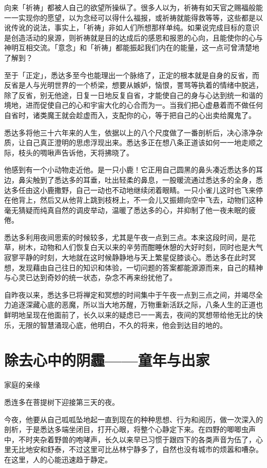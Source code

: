 \documentclass[12pt,twoside,openany]{book}
\begin{document}
向来「祈祷」都被人自己的欲望所操纵了。很多人以为，祈祷有如天官之赐福般能一一实现你的愿望，以为念经可以得什么福报，或祈祷就能得救等等，这些都是以讹传讹的说法，事实上，「祈祷」非如人们所想那样单纯。如果说完成目标的意识是创造活动的泉源，则祈祷就是目的达成后的感恩和报恩的心向，且能使你的心与神明互相交流。「意念」和「祈祷」都能振起我们内在的能量，这一点可曾清楚地了解到？

至于「正定」，悉达多至今也能理出一个脉络了，正定的根本就是自身的反省，而反省是人与光明世界的一个桥梁，想要从嫉妒，恼恨，詈骂等执着的情绪中脱逃，除了反省，别无他途，日复一日地反复自省，才能使自己的身与心达到统一和谐的境地，进而促使自己的心和宇宙大化的心合而为一。当我们把心虚悬着而不做任何自省时，诸类魔王就会趁虚而入，支配你的心，等于把自己的心出卖给魔鬼了。

悉达多将他三十六年来的人生，依据以上的八个尺度做了一番剖析后，决心涤净杂质，让自己真正澄明的思虑浮现出来。悉达多正在想八条正道该如何一一地走顺之际，枝头的啁啾声告诉他，天将拂晓了。

他感到有一个小动物走近他。是一只小鹿！它正用自己圆黑的鼻头凑近悉达多的耳边，鼻尖触到了悉达多的耳垂，吐出轻柔的鼻息，一股暖流通过悉达多的全身，悉达多任由这小鹿撒野，自己一动也不动地继续闭着眼睛。一只小雀儿这时也飞来停在他背上，然后又从他背上跳到枝枒上，不一会儿又振翅向空中飞去，动物们这种毫无猜疑而纯真自然的调皮举动，温暖了悉达多的心，并抑制了他一夜未眠的疲倦。

悉达多利用夜间思索的时候较多，尤其是午夜一点到三点。本来这段时间，是花草，树木，动物和人们恢复白天以来的辛劳而酣睡休憩的大好时刻，同时也是大气寂寥平静的时刻，大地就在这时候静静地与天上繁星促膝谈心。悉达多在此时冥想，发现藉由自己往日的知识和体验，一切问题的答案都能源源而来，自己的精神与心灵已达到奇妙的统一状态，杂念不再来纷扰他了。

自昨夜以来，悉达多已将禅定和冥想的时间集中于午夜一点到三点之间，并竭尽全力追逐深藏心底的恶魔，所以当大地苏醒，万物重新活跃之际，八条人生的正道也鲜明地呈现在他面前了，长久以来的疑虑已一一离去，夜间的冥想带给他无比的快乐，无限的智慧涌现心底，他明白，不久的将来，他会到达目的地的。

\section{除去心中的阴霾——童年与出家}\label{sec1.12}

家庭的亲缘

悉连多在菩提树下迎接第三天的夜。

今夜，他要从自己呱呱坠地起一直到现在的种种思想、行为和阅历，做一次深入的剖析，于是悉达多端坐闭目，打开心眼，将整个心静定下来。在四野的唧唧虫声中，不时夹杂着野兽的咆哮声，长久以来早已习惯于跟四下的各类声音为伍了，心里无比地安和舒泰，不过这里可比丛林宁静多了，自然也没有城市的烦嚣和嘈杂。在这里，人的心能迅速趋于静定。
\end{document}
